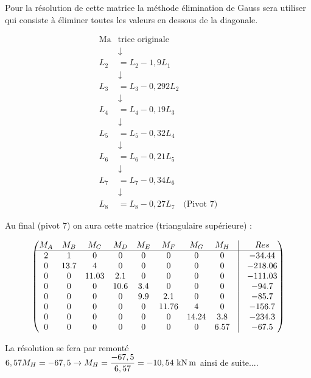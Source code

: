 Pour la résolution de cette matrice la méthode élimination de Gauss sera utiliser qui consiste à éliminer toutes les valeurs en dessous de la diagonale.

\[ \begin{aligned}
	\text{Ma} & \text{trice originale} \\
	&\downarrow \\
	L_{2} &= L_{2} - 1,9L_{1} \\
	&\downarrow \\
	L_{3} &= L_{3} - 0,292L_{2} \\
	&\downarrow \\
	L_{4} &= L_{4} - 0,19L_{3} \\
	&\downarrow \\
	L_{5} &= L_{5} - 0,32L_{4} \\
	&\downarrow \\
	L_{6} &= L_{6} - 0,21L_{5} \\
	&\downarrow \\
	L_{7} &= L_{7} - 0,34L_{6} \\
	&\downarrow \\
	L_{8} &= L_{8} - 0,27L_{7} \quad \text{(Pivot 7)}
\end{aligned} \]


Au final (pivot 7) on aura cette matrice (triangulaire supérieure) : 

\[
\begin{pmatrix}
	M_{A} & M_{B} & M_{C} & M_{D} & M_{E} & M_{F} & M_{G} & M_{H} & \vline & Res \\ \hline
	2 & 1 & 0 & 0 & 0 & 0 & 0 & 0 & \vline & -34.44 \\
	0 & 13.7 & 4 & 0 & 0 & 0 & 0 & 0 & \vline & -218.06 \\
	0 & 0 & 11.03 & 2.1 & 0 & 0 & 0 & 0 & \vline & -111.03 \\
	0 & 0 & 0 & 10.6 & 3.4 & 0 & 0 & 0 & \vline & -94.7 \\
	0 & 0 & 0 & 0 & 9.9 & 2.1 & 0 & 0 & \vline & -85.7 \\
	0 & 0 & 0 & 0 & 0 & 11.76 & 4 & 0 & \vline & -156.7 \\
	0 & 0 & 0 & 0 & 0 & 0 & 14.24 & 3.8 & \vline & -234.3 \\
	0 & 0 & 0 & 0 & 0 & 0 & 0 & 6.57 & \vline & -67.5
\end{pmatrix}
\]

La résolution se fera par remonté $6,57M_{H} = -67,5 \rightarrow M_{H} = \dfrac{-67,5}{6,57} = -10,54\knxm$ ainsi de suite....



